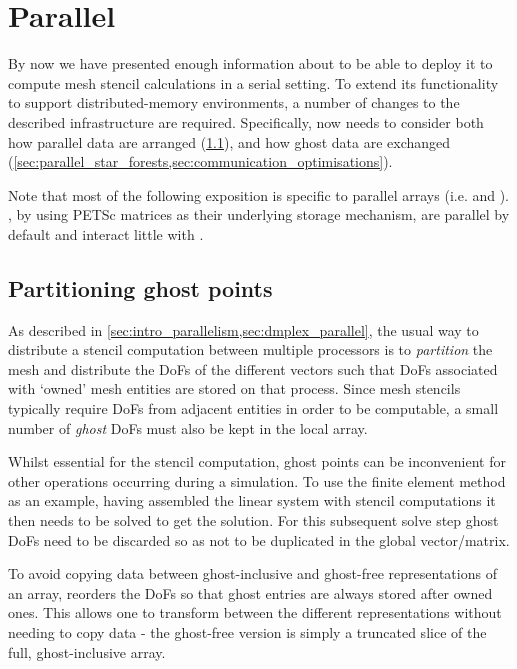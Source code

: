 \documentclass[thesis]{subfiles}
\begin{document}
\chapter{Parallel}
\label{chapter:parallel}

By now we have presented enough information about  to be able to deploy it to compute mesh stencil calculations in a serial setting.
To extend its functionality to support distributed-memory environments, a number of changes to the described infrastructure are required.
Specifically,  now needs to consider both how parallel data are arranged (\cref{sec:parallel_data_layouts}), and how ghost data are exchanged (\cref{sec:parallel_star_forests,sec:communication_optimisations}).

Note that most of the following exposition is specific to parallel arrays (i.e.  and ).
, by using PETSc matrices as their underlying storage mechanism, are parallel by default and interact little with .

\section{Partitioning ghost points}
\label{sec:parallel_data_layouts}

As described in \cref{sec:intro_parallelism,sec:dmplex_parallel}, the usual way to distribute a stencil computation between multiple processors is to \emph{partition} the mesh and distribute the DoFs of the different vectors such that DoFs associated with `owned' mesh entities are stored on that process.
Since mesh stencils typically require DoFs from adjacent entities in order to be computable, a small number of \emph{ghost} DoFs must also be kept in the local array.

Whilst essential for the stencil computation, ghost points can be inconvenient for other operations occurring during a simulation.
To use the finite element method as an example, having assembled the linear system with stencil computations it then needs to be solved to get the solution.
For this subsequent solve step ghost DoFs need to be discarded so as not to be duplicated in the global vector/matrix.

To avoid copying data between ghost-inclusive and ghost-free representations of an array,  reorders the DoFs so that ghost entries are always stored after owned ones.
This allows one to transform between the different representations without needing to copy data - the ghost-free version is simply a truncated slice of the full, ghost-inclusive array.
\end{document}
